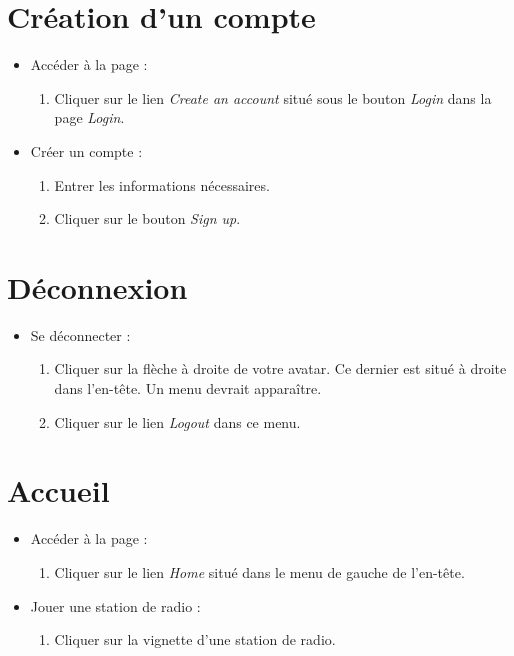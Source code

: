 \documentclass[12pt, letterpaper]{article}
\begin{document}
    \section*{Création d'un compte}
    \begin{itemize}
        \item Accéder à la page :
        \begin{enumerate}
            \item Cliquer sur le lien \textit{Create an account} situé sous le bouton \textit{Login} dans la page \textit{Login}.
        \end{enumerate}

        \item Créer un compte :
        \begin{enumerate}
            \item Entrer les informations nécessaires.
            \item Cliquer sur le bouton \textit{Sign up}.
        \end{enumerate}
    \end{itemize}

    \section*{Déconnexion}
    \begin{itemize}
    \item Se déconnecter :
        \begin{enumerate}
            \item Cliquer sur la flèche à droite de votre avatar. Ce dernier est situé à droite dans l'en-tête. Un menu devrait apparaître.
            \item Cliquer sur le lien \textit{Logout} dans ce menu.
        \end{enumerate}
    \end{itemize}

    \section*{Accueil}
    \begin{itemize}
        \item Accéder à la page :
        \begin{enumerate}
            \item Cliquer sur le lien \textit{Home} situé dans le menu de gauche de l'en-tête.
        \end{enumerate}

        \item Jouer une station de radio :
        \begin{enumerate}
            \item Cliquer sur la vignette d'une station de radio.
        \end{enumerate}
    \end{itemize}
\end{document}
